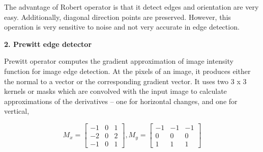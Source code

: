 \documentclass[conference]{IEEEtran}
\begin{document}
The advantage of Robert operator is that it detect edges and orientation are very easy. Additionally, diagonal direction points are preserved. However, this operation is very sensitive to noise and not very accurate in edge detection. 

\clearpage

\textbf{2. Prewitt edge detector}
\newline

Prewitt operator computes the gradient approximation of image intensity function for image edge detection. At the pixels of an image, it produces either the normal to a vector or the corresponding gradient vector. It uses two 3 x 3 kernels or masks which are convolved with the input image to calculate approximations of the derivatives – one for horizontal changes, and one for vertical,

\[ M_x = 
\begin{bmatrix}
-1 & 0 & 1\\
-2 & 0 & 2\\
-1 & 0 & 1
\end{bmatrix}, 
M_y = 
\begin{bmatrix}
-1 & -1 & -1\\
0 & 0 & 0\\
1 & 1 & 1
\end{bmatrix}
\]
\end{document}
